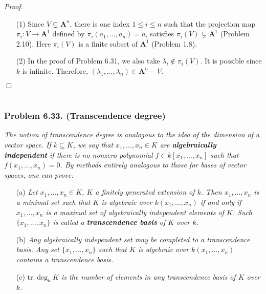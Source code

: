 \documentclass{article}
\begin{document}
\emph{Proof.}
\begin{enumerate}
\item[(1)]
  Since $V \subsetneq \mathbf{A}^{n}$,
  there is one index $1 \leq i \leq n$
  such that the projection map $\pi_i: V \to \mathbf{A}^{1}$
  defined by $\pi_i(a_1,\ldots,a_n) = a_i$ satisfies
  $\pi_i(V) \subsetneq \mathbf{A}^{1}$ (Problem 2.10).
  Here $\pi_i(V)$ is a finite subset of $\mathbf{A}^{1}$ (Problem 1.8).

\item[(2)]
  In the proof of Problem 6.31,
  we also take $\lambda_i \not\in \pi_i(V)$.
  It is possible since $k$ is infinite.
  Therefore, $(\lambda_1,\ldots,\lambda_n) \in \mathbf{A}^{n} - V$.
\end{enumerate}
$\Box$ \\\\






\subsubsection*{Problem 6.33. (Transcendence degree)}
\emph{The notion of transcendence degree is analogous to
the idea of the dimension of a vector space.
If $k \subseteq K$, we say that $x_1,\ldots,x_n \in K$ are \textbf{algebraically independent} if
there is no nonzero polynomial $f \in k[x_1,\ldots,x_n]$ such that $f(x_1,\ldots,x_n) = 0$.
By methods entirely analogous to those for bases of vector spaces, one can prove:}
\begin{enumerate}
\item[(a)]
  \emph{Let $x_1,\ldots,x_n \in K$, $K$ a finitely generated extension of $k$.
  Then $x_1,\ldots,x_n$ is a minimal set such that
  $K$ is algebraic over $k(x_1,\ldots,x_n)$ if and only if
  $x_1,\ldots,x_n$ is a maximal set of algebraically independent elements of $K$.
  Such $\{ x_1,\ldots,x_n \}$ is called a \textbf{transcendence basis} of $K$ over $k$.}

\item[(b)]
  \emph{Any algebraically independent set may be completed to a transcendence basis.
  Any set $\{ x_1,\ldots,x_n \}$ such that
  $K$ is algebraic over $k(x_1,\ldots,x_n)$ contains a transcendence basis.}

\item[(c)]
  \emph{$\mathrm{tr.} \deg_k K$ is
  the number of elements in any transcendence basis of $K$ over $k$.} \\
\end{enumerate}
\end{document}

